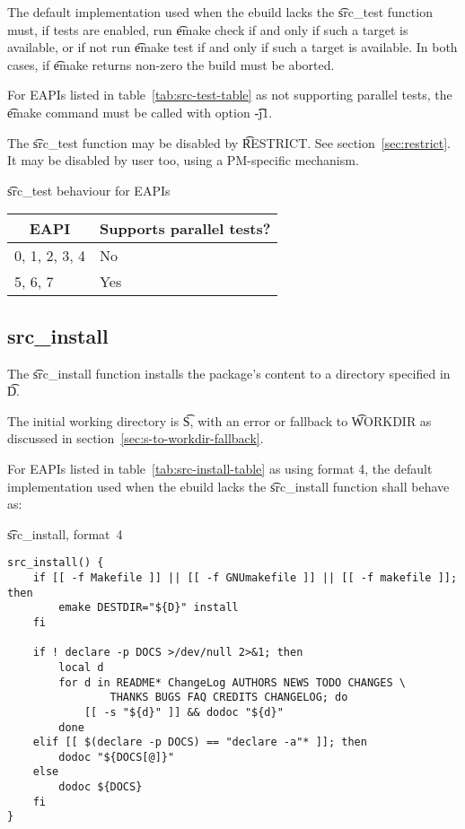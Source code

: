The default implementation used when the ebuild lacks the \t{src_test} function must, if tests are
enabled, run \t{emake check} if and only if such a target is available, or if not run
\t{emake test} if and only if such a target is available. In both cases, if \t{emake} returns
non-zero the build must be aborted.

 For EAPIs listed in table~\ref{tab:src-test-table} as not supporting
parallel tests, the \t{emake} command must be called with option \t{-j1}.

The \t{src_test} function may be disabled by \t{RESTRICT}\@. See section~\ref{sec:restrict}. It may
be disabled by user too, using a PM-specific mechanism.

\begin{centertable}{\t{src_test} behaviour for EAPIs}
    \label{tab:src-test-table}
    \begin{tabular}{ll}
      \toprule
      \multicolumn{1}{c}{\textbf{EAPI}} &
      \multicolumn{1}{c}{\textbf{Supports parallel tests?}} \\
      \midrule
      0, 1, 2, 3, 4     & No  \\
      5, 6, 7           & Yes \\
      \bottomrule
    \end{tabular}
\end{centertable}

\subsection{src_install}

 The \t{src_install} function installs the package's content to a
directory specified in \t{D}.

The initial working directory is \t{S}, with an error or fallback to \t{WORKDIR} as discussed in
section~\ref{sec:s-to-workdir-fallback}.

 For EAPIs listed in table~\ref{tab:src-install-table} as using format
4, the default implementation used when the ebuild lacks the \t{src_install} function shall behave
as:

\begin{listing}[H]
\caption{\t{src_install}, format~4}
\begin{verbatim}
src_install() {
    if [[ -f Makefile ]] || [[ -f GNUmakefile ]] || [[ -f makefile ]]; then
        emake DESTDIR="${D}" install
    fi

    if ! declare -p DOCS >/dev/null 2>&1; then
        local d
        for d in README* ChangeLog AUTHORS NEWS TODO CHANGES \
                THANKS BUGS FAQ CREDITS CHANGELOG; do
            [[ -s "${d}" ]] && dodoc "${d}"
        done
    elif [[ $(declare -p DOCS) == "declare -a"* ]]; then
        dodoc "${DOCS[@]}"
    else
        dodoc ${DOCS}
    fi
}
\end{verbatim}
\end{listing}

